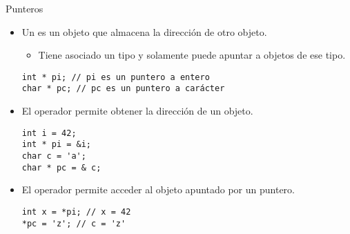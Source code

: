 \begin{frame}[t,fragile]{Punteros}
\begin{itemize}
  \item Un  es un objeto que almacena la dirección de otro objeto.
    \begin{itemize}
      \item Tiene asociado un tipo y solamente puede apuntar a objetos de ese tipo.
    \end{itemize}
\begin{lstlisting}
int * pi; // pi es un puntero a entero
char * pc; // pc es un puntero a carácter
\end{lstlisting}

  \item El operador \cppkey{\&} permite obtener la dirección de un objeto.
\begin{lstlisting}
int i = 42;
int * pi = &i;
char c = 'a';
char * pc = & c;
\end{lstlisting}

  \item El operador \cppkey{*} permite acceder al objeto apuntado por un puntero.
\begin{lstlisting}
int x = *pi; // x = 42
*pc = 'z'; // c = 'z'
\end{lstlisting}
\end{itemize}
\end{frame}
